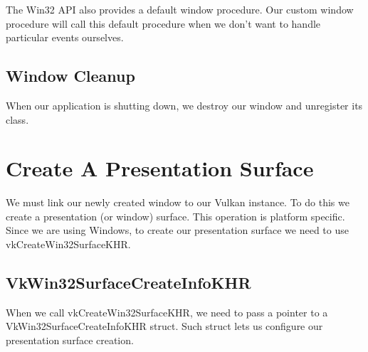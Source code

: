 The Win32 API also provides a default window procedure.
Our custom window procedure will call this default procedure when we don't want
to handle particular events ourselves.

\begin{minipage}{\linewidth}{\noindent}
    
\end{minipage}

\subsection{Window Cleanup}

When our application is shutting down, we destroy our window and unregister
its class.

\begin{minipage}{\linewidth}{\noindent}
    
\end{minipage}

\section{Create A Presentation Surface}

We must link our newly created window to our Vulkan instance.
To do this we create a presentation (or window) surface.
This operation is platform specific.
Since we are using Windows, to create our presentation surface we need
to use vkCreateWin32SurfaceKHR.

\begin{minipage}{\linewidth}{\noindent}
    
\end{minipage}

\subsection{VkWin32SurfaceCreateInfoKHR}

When we call vkCreateWin32SurfaceKHR, we need to pass a pointer to a
VkWin32SurfaceCreateInfoKHR struct.
Such struct lets us configure our presentation surface creation.

